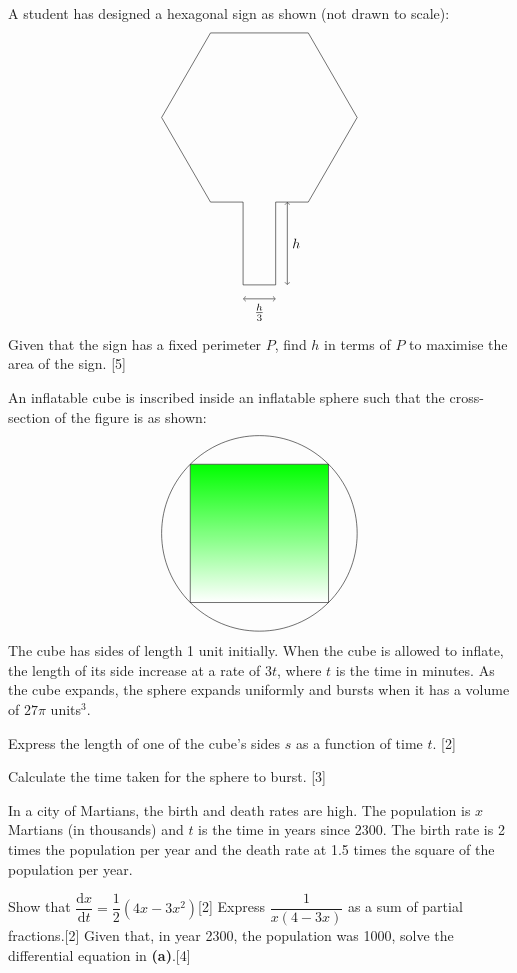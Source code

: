 \documentclass[12pt, a4 paper]{article}
\begin{document}
\begin{outline}[enumerate]
 \1 A student has designed a hexagonal sign as shown (not drawn to scale):
\[
 \begin{tikzpicture}
   \draw (70pt,0) -- (35pt,60.62178pt) -- (-35pt,60.62178pt) -- (-70pt,0) -- (-35pt,-60.62178pt) -- (-11.66667pt,-60.62178pt) -- (-11.66667pt,-120pt) -- (11.66667pt,-120pt) --(11.66667pt,-60.62178pt) -- (35pt,-60.62178pt) -- cycle;
   \draw[<->](-11.66667pt,-130pt) -- (0,-130pt) node[below] {$\frac{h}{3}$} -- (11.66667pt,-130pt);
   \draw[<->](20pt,-120pt) -- (20pt,-90.31089pt) node[right] {$h$} -- (20pt,-60.62178pt);
 \end{tikzpicture}
 \]
 Given that the sign has a fixed perimeter $P$, find $h$ in terms of $P$ to maximise the area of the sign. \hfill[5]


 \1 An inflatable cube is inscribed inside an inflatable sphere such that the cross-section of the figure is as shown:
 \[
 \begin{tikzpicture}
   \draw (0,0) circle (70pt);
   \shade[top color=green,bottom color=white,draw=black] (49.497475pt,-49.497475pt) rectangle (-49.497475pt,49.497475pt);
 \end{tikzpicture}
   \]
  The cube has sides of length 1 unit initially. When the cube is allowed to inflate, the length of its side increase at a rate of $3t$, where $t$ is the time in minutes. As the cube expands, the sphere expands uniformly and bursts when it has a volume of $27\pi$ units$^3$.

  \2 Express the length of one of the cube's sides $s$ as a function of time $t$. \hfill[2]

  \2 Calculate the time taken for the sphere to burst. \hfill[3]

 \1 In a city of Martians, the birth and death rates are high. The population is $x$ Martians (in thousands) and $t$ is the time in years since 2300. The birth rate is 2 times the population per year and the death rate at 1.5 times the square of the population per year.

 \2 Show that $\dfrac{{{\textrm{d}}x}}{{{\textrm{d}}t}} = \dfrac{1}{2}(4x - 3{x^2})$\hfill[2]
 \2 Express $\dfrac{1}{{x(4 - 3x)}}$ as a sum of partial fractions.\hfill[2]
 \2 Given that, in year 2300, the population was 1000, solve the differential equation in \textbf{(a)}.\hfill[4]



\end{outline}
\end{document}
